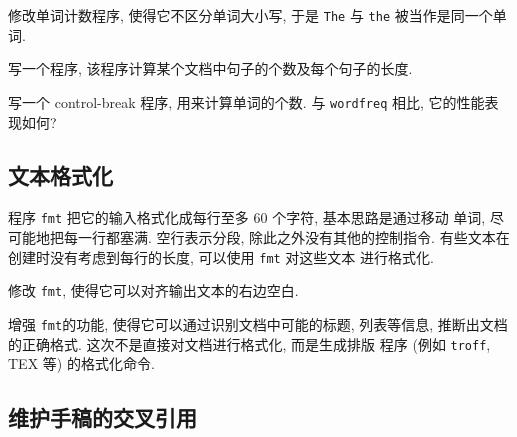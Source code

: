 {\begin{exercise}
    修改单词计数程序, 使得它不区分单词大小写, 于是 \texttt{The} 与
    \texttt{the} 被当作是同一个单词.
\end{exercise}

\begin{exercise}
    写一个程序, 该程序计算某个文档中句子的个数及每个句子的长度.
\end{exercise}

\begin{exercise}
    写一个 control-break 程序, 用来计算单词的个数. 与 \texttt{wordfreq} 
    相比, 它的性能表现如何?
\end{exercise}

\subsection{文本格式化}
\label{subsec:text_formatting}

程序 \texttt{fmt} 把它的输入格式化成每行至多 60 个字符, 基本思路是通过移动
单词, 尽可能地把每一行都塞满. 空行表示分段, 除此之外没有其他的控制指令.
有些文本在创建时没有考虑到每行的长度, 可以使用 \texttt{fmt} 对这些文本
进行格式化.

\begin{exercise}
    修改 \texttt{fmt}, 使得它可以对齐输出文本的右边空白.
\end{exercise}

\begin{exercise}
    增强 \texttt{fmt}的功能, 使得它可以通过识别文档中可能的标题, 列表等信息,
    推断出文档的正确格式. 这次不是直接对文档进行格式化, 而是生成排版
    程序 (例如 \texttt{troff}, TEX 等) 的格式化命令.
\end{exercise}

\subsection{维护手稿的交叉引用}
\label{subsec:maintaining_cross_reference_in_manuscripts}

}
